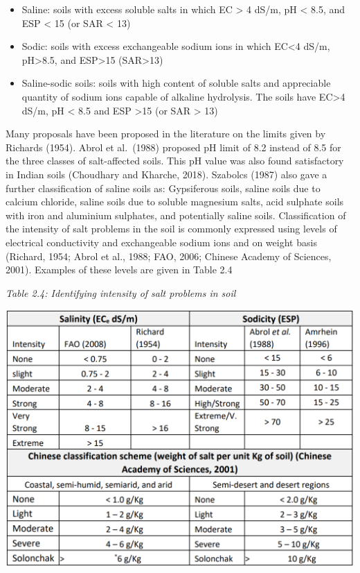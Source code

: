 \documentclass[
  10pt,
  b5paper,
]{book}
\providecommand{\tightlist}{%
  \setlength{\itemsep}{0pt}\setlength{\parskip}{0pt}}
\begin{document}
\begin{itemize}
\tightlist
\item
  Saline: soils with excess soluble salts in which EC \textgreater{} 4 dS/m, pH \textless{} 8.5, and ESP \textless{} 15 (or SAR \textless{} 13)
\item
  Sodic: soils with excess exchangeable sodium ions in which EC\textless4 dS/m, pH\textgreater8.5, and ESP\textgreater15 (SAR\textgreater13)
\item
  Saline-sodic soils: soils with high content of soluble salts and appreciable quantity of sodium ions capable of alkaline hydrolysis. The soils have EC\textgreater4 dS/m, pH \textless{} 8.5 and ESP \textgreater15 (or SAR \textgreater{} 13)
\end{itemize}

Many proposals have been proposed in the literature on the limits given by Richards (1954). Abrol et al.~(1988) proposed pH limit of 8.2 instead of 8.5 for the three classes of salt-affected soils. This pH value was also found satisfactory in Indian soils (Choudhary and Kharche, 2018). Szabolcs (1987) also gave a further classification of saline soils as: Gypsiferous soils, saline soils due to calcium chloride, saline soils due to soluble magnesium salts, acid sulphate soils with iron and aluminium sulphates, and potentially saline soils.
Classification of the intensity of salt problems in the soil is commonly expressed using levels of electrical conductivity and exchangeable sodium ions and on weight basis (Richard, 1954; Abrol et al., 1988; FAO, 2006; Chinese Academy of Sciences, 2001). Examples of these levels are given in Table 2.4

\emph{Table 2.4: Identifying intensity of salt problems in soil}

\includegraphics{figures/tables/Table_2.4.PNG}
\end{document}
